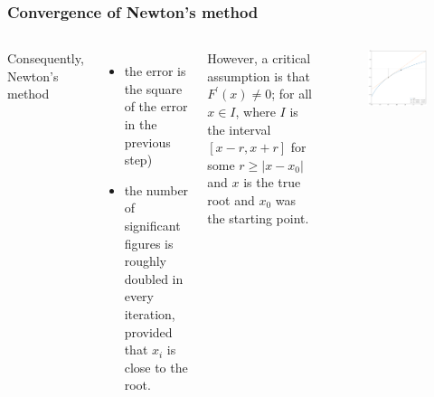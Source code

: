 \documentclass[hyperref={colorlinks=true}]{beamer}
\begin{document}

\begin{frame}%
  \frametitle{Convergence of Newton's method}

  \begin{columns}
  
   
      Consequently, Newton's method 
      \begin{itemize}
        \item the error is the square of the error in the previous step)
        \item the number of significant figures is roughly doubled in every iteration, provided that $x_i$ is  close to the root.
      \end{itemize} 
         
      However, a critical assumption is that $F^{\prime}(x) \neq 0$; for all $x \in I$, where $I$ is the interval $[x - r, x + r]$ for some $r \geq |x - x_0|$ and $x$ is the true root and $x_0$ was the starting point.
         
    
      \begin{figure}
        \includegraphics[width=\columnwidth]{../Lecture10/NewtonsMethodExample-lnx.png}
      \end{figure}
    
  \end{columns}

\end{frame}
\end{document}
